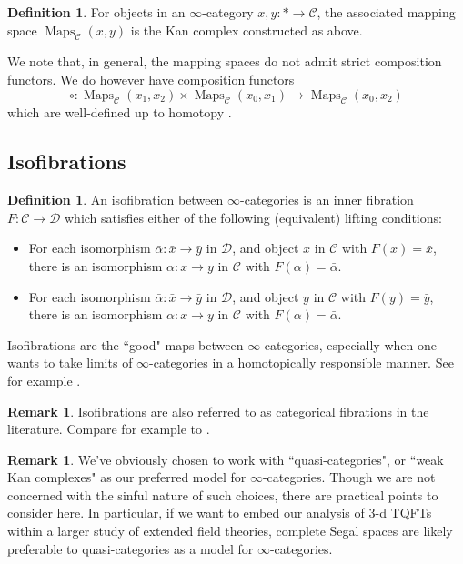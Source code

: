\documentclass[reqno]{amsart}
\theoremstyle{definition}
\newtheorem{definition}[lemma]{Definition}
\newtheorem{remark}[lemma]{Remark}
\newcommand{\msc}[1]{\mathscr{#1}}
\DeclareMathOperator{\Maps}{Maps}
\renewcommand{\1}{\mathbf{1}}
\begin{document}
\begin{definition}
For objects in an $\infty$-category $x,y:\ast\to \msc{C}$, the associated mapping space $\Maps_{\msc{C}}(x,y)$ is the Kan complex constructed as above.
\end{definition}

We note that, in general, the mapping spaces do not admit strict composition functors.  We do however have composition functors
\[
\circ:\Maps_{\msc{C}}(x_1,x_2)\times \Maps_{\msc{C}}(x_0,x_1)\to \Maps_{\msc{C}}(x_0,x_2)
\]
which are well-defined up to homotopy \cite[\href{https://kerodon.net/tag/01PQ}{01PQ}]{kerodon}.

\subsection{Isofibrations}

\begin{definition}
An isofibration between $\infty$-categories is an inner fibration $F:\msc{C}\to \msc{D}$ which satisfies either of the following (equivalent) lifting conditions:
\begin{itemize}
\item For each isomorphism $\bar{\alpha}:\bar{x}\to \bar{y}$ in $\msc{D}$, and object $x$ in $\msc{C}$ with $F(x)=\bar{x}$, there is an isomorphism $\alpha:x\to y$ in $\msc{C}$ with $F(\alpha)=\bar{\alpha}$.\vspace{1.5mm}
\item For each isomorphism $\bar{\alpha}:\bar{x}\to \bar{y}$ in $\msc{D}$, and object $y$ in $\msc{C}$ with $F(y)=\bar{y}$, there is an isomorphism $\alpha:x\to y$ in $\msc{C}$ with $F(\alpha)=\bar{\alpha}$.
\end{itemize}
\end{definition}

Isofibrations are the ``good" maps between $\infty$-categories, especially when one wants to take limits of $\infty$-categories in a homotopically responsible manner.  See for example \cite[\href{https://kerodon.net/tag/03GF}{03GF}, \href{https://kerodon.net/tag/03H3}{03H3}, \href{lurie09p://kerodon.net/tag/033P}{033P}]{kerodon}.

\begin{remark}
Isofibrations are also referred to as categorical fibrations in the literature. Compare for example \cite{lurie09} to \cite{cisinski19,kerodon}. 
\end{remark}

\begin{remark}
We've obviously chosen to work with ``quasi-categories", or ``weak Kan complexes" as our preferred model for $\infty$-categories.  Though we are not concerned with the sinful nature of such choices, there are practical points to consider here.  In particular, if we want to embed our analysis of $3$-d TQFTs within a larger study of extended field theories, complete Segal spaces are likely preferable to quasi-categories as a model for $\infty$-categories.
\end{remark}
\end{document}
